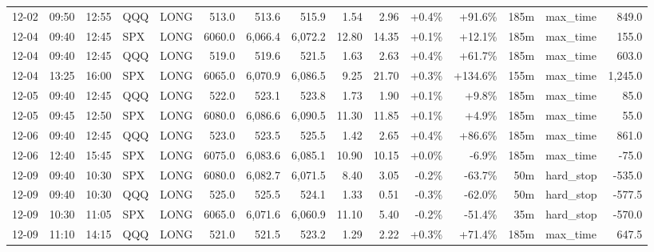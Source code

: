 \documentclass[11pt,a4paper,twoside]{article}
\begin{document}
\begin{landscape}
\begin{center}
\begin{longtable}{>{\color{txtmain}}l l l l l r r r r r r r r >{\color{txtmain}}l r}
12-02 & 09:50 & 12:55 & QQQ & LONG & 513.0 & 513.6 & 515.9 & 1.54 & 2.96 & \textcolor{wingreen}{+0.4\%} & \textcolor{wingreen}{+91.6\%} & 185m & max\_time & \textcolor{wingreen}{849.0} \\
12-04 & 09:40 & 12:45 & SPX & LONG & 6060.0 & 6,066.4 & 6,072.2 & 12.80 & 14.35 & \textcolor{wingreen}{+0.1\%} & \textcolor{wingreen}{+12.1\%} & 185m & max\_time & \textcolor{wingreen}{155.0} \\
12-04 & 09:40 & 12:45 & QQQ & LONG & 519.0 & 519.6 & 521.5 & 1.63 & 2.63 & \textcolor{wingreen}{+0.4\%} & \textcolor{wingreen}{+61.7\%} & 185m & max\_time & \textcolor{wingreen}{603.0} \\
12-04 & 13:25 & 16:00 & SPX & LONG & 6065.0 & 6,070.9 & 6,086.5 & 9.25 & 21.70 & \textcolor{wingreen}{+0.3\%} & \textcolor{wingreen}{+134.6\%} & 155m & max\_time & \textcolor{wingreen}{1,245.0} \\
12-05 & 09:40 & 12:45 & QQQ & LONG & 522.0 & 523.1 & 523.8 & 1.73 & 1.90 & \textcolor{wingreen}{+0.1\%} & \textcolor{wingreen}{+9.8\%} & 185m & max\_time & \textcolor{wingreen}{85.0} \\
12-05 & 09:45 & 12:50 & SPX & LONG & 6080.0 & 6,086.6 & 6,090.5 & 11.30 & 11.85 & \textcolor{wingreen}{+0.1\%} & \textcolor{wingreen}{+4.9\%} & 185m & max\_time & \textcolor{wingreen}{55.0} \\
12-06 & 09:40 & 12:45 & QQQ & LONG & 523.0 & 523.5 & 525.5 & 1.42 & 2.65 & \textcolor{wingreen}{+0.4\%} & \textcolor{wingreen}{+86.6\%} & 185m & max\_time & \textcolor{wingreen}{861.0} \\
12-06 & 12:40 & 15:45 & SPX & LONG & 6075.0 & 6,083.6 & 6,085.1 & 10.90 & 10.15 & \textcolor{wingreen}{+0.0\%} & \textcolor{lossred}{-6.9\%} & 185m & max\_time & \textcolor{lossred}{-75.0} \\
12-09 & 09:40 & 10:30 & SPX & LONG & 6080.0 & 6,082.7 & 6,071.5 & 8.40 & 3.05 & \textcolor{lossred}{-0.2\%} & \textcolor{lossred}{-63.7\%} & 50m & hard\_stop & \textcolor{lossred}{-535.0} \\
12-09 & 09:40 & 10:30 & QQQ & LONG & 525.0 & 525.5 & 524.1 & 1.33 & 0.51 & \textcolor{lossred}{-0.3\%} & \textcolor{lossred}{-62.0\%} & 50m & hard\_stop & \textcolor{lossred}{-577.5} \\
12-09 & 10:30 & 11:05 & SPX & LONG & 6065.0 & 6,071.6 & 6,060.9 & 11.10 & 5.40 & \textcolor{lossred}{-0.2\%} & \textcolor{lossred}{-51.4\%} & 35m & hard\_stop & \textcolor{lossred}{-570.0} \\
12-09 & 11:10 & 14:15 & QQQ & LONG & 521.0 & 521.5 & 523.2 & 1.29 & 2.22 & \textcolor{wingreen}{+0.3\%} & \textcolor{wingreen}{+71.4\%} & 185m & max\_time & \textcolor{wingreen}{647.5} \\

\end{longtable}
\end{center}
\end{landscape}
\end{document}
